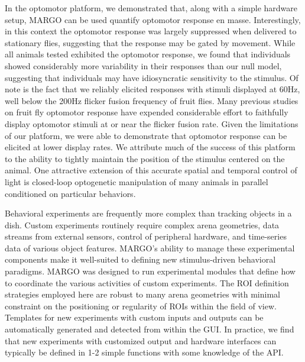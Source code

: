 \documentclass[10pt]{article}
\begin{document}
\begin{multicols}{2}
In the optomotor platform, we demonstrated that, along with a simple hardware setup, MARGO can be used quantify optomotor response en masse. Interestingly, in this context the optomotor response was largely suppressed when delivered to stationary flies, suggesting that the response may be gated by movement. While all animals tested exhibited the optomotor response, we found that individuals showed considerably more variability in their responses than our null model, suggesting that individuals may have idiosyncratic sensitivity to the stimulus. Of note is the fact that we reliably elicited responses with stimuli displayed at 60Hz, well below the 200Hz flicker fusion frequency of fruit flies. Many previous studies on fruit fly optomotor response have expended considerable effort to faithfully display optomotor stimuli at or near the flicker fusion rate. Given the limitations of our platform, we were able to demonstrate that optomotor response can be elicited at lower display rates. We attribute much of the success of this platform to the ability to tightly maintain the position of the stimulus centered on the animal. One attractive extension of this accurate spatial and temporal control of light is closed-loop optogenetic manipulation of many animals in parallel conditioned on particular behaviors.

Behavioral experiments are frequently more complex than tracking objects in a dish. Custom experiments routinely require complex arena geometries, data streams from external sensors, control of peripheral hardware, and time-series data of various object features. MARGO's ability to manage these experimental components make it well-suited to defining new stimulus-driven behavioral paradigms. MARGO was designed to run experimental modules that define how to coordinate the various activities of custom experiments. The ROI definition strategies employed here are robust to many arena geometries with minimal constraint on the positioning or regularity of ROIs within the field of view. Templates for new experiments with custom inputs and outputs can be automatically generated and detected from within the GUI. In practice, we find that new experiments with customized output and hardware interfaces can typically be defined in 1-2 simple functions with some knowledge of the API.


\end{multicols}
\end{document}
